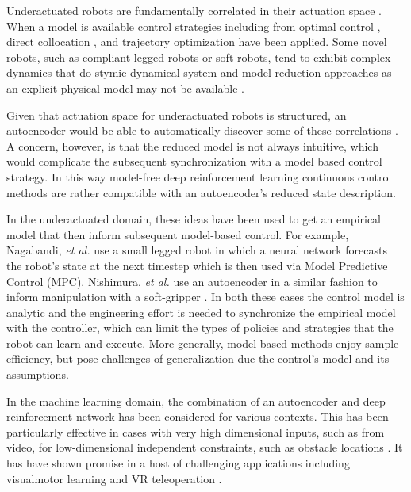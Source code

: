 \documentclass[letterpaper, 10 pt, conference]{ieeeconf}
\begin{document}
Underactuated robots are fundamentally correlated in their actuation space  \cite{tedrake2009underactuated}.
When a model is available control strategies including from optimal control \cite{betts2010practical}, direct collocation \cite{von1993numerical}, and trajectory optimization \cite{kalakrishnan2011stomp} have been applied.
Some novel robots, such as compliant legged robots or soft robots, tend to exhibit complex dynamics that do stymie dynamical system and model reduction approaches as an explicit physical model may not be available \cite{nakajima2015information}.

Given that actuation space for underactuated robots is structured, an autoencoder would be able to automatically discover some of these correlations \cite{AE_hinton2006reducing, ngsparse}.
A concern, however, is that the reduced model is not always intuitive, which would complicate the subsequent synchronization with a model based control strategy.
In this way model-free deep reinforcement learning continuous control methods are rather compatible with an autoencoder's reduced state description.


In the underactuated domain, these ideas have been used to get an empirical model that then inform subsequent model-based control.  For example, Nagabandi, \emph{et al.} \cite{nagabandi2018learning} use a small legged robot in which a neural network forecasts the robot's state at the next timestep which is then used via Model Predictive Control (MPC).  Nishimura, \emph{et al.} use an autoencoder in a similar fashion to inform manipulation with a soft-gripper \cite{nishimura2017thin}.  In both these cases the control model is analytic and the engineering effort is needed to synchronize the empirical model with the controller, which can limit the types of policies and strategies that the robot can learn and execute.  
More generally, model-based methods enjoy sample efficiency, but pose challenges of generalization due the control's model and its assumptions.  

In the machine learning domain, the combination of an autoencoder and deep reinforcement network has been considered for various contexts. 
This has been particularly effective in cases with very high dimensional inputs, such as from video, for low-dimensional independent constraints, such as obstacle locations \cite{finn2016deep, bitzer2010using, lynch2019learning}.  
It has have shown promise in a host of challenging applications including visualmotor learning \cite{finn2016deep} and VR teleoperation \cite{zhang2018deep}. 
\end{document}
